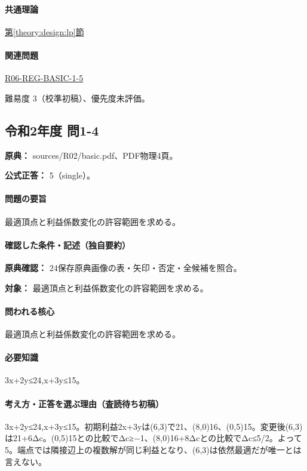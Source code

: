 \paragraph{共通理論} \hyperref[theory:design:lp]{第\ref*{theory:design:lp}節}

\paragraph{関連問題} \hyperref[q:r06-reg-basic-1-5]{R06-REG-BASIC-1-5}

\par 難易度 3（校準初稿）、優先度未評価。

\subsection{令和2年度 問1-4}
\label{q:r02-reg-basic-1-4}

\noindent\textbf{原典：} sources/R02/basic.pdf、PDF物理4頁。

\textbf{公式正答：} 5（single）。

\paragraph{問題の要旨} 最適頂点と利益係数変化の許容範囲を求める。

\paragraph{確認した条件・記述（独自要約）}\mbox{}\par

\noindent\textbf{原典確認：} 24保存原典画像の表・矢印・否定・全候補を照合。\par

\noindent\textbf{対象：} 最適頂点と利益係数変化の許容範囲を求める。\par

\paragraph{問われる核心} 最適頂点と利益係数変化の許容範囲を求める。

\paragraph{必要知識} 3x+2y≤24,x+3y≤15。

\paragraph{考え方・正答を選ぶ理由（査読待ち初稿）} 3x+2y≤24,x+3y≤15。初期利益2x+3yは(6,3)で21、(8,0)16、(0,5)15。変更後(6,3)は21+6Δc。(0,5)15との比較でΔc≥−1、(8,0)16+8Δcとの比較でΔc≤5/2。よって5。端点では隣接辺上の複数解が同じ利益となり、(6,3)は依然最適だが唯一とは言えない。

